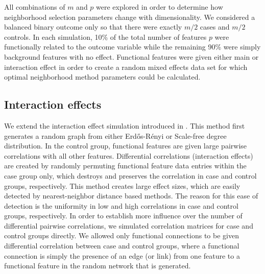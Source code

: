 \documentclass[10pt,letterpaper]{article}\usepackage[]{graphicx}\usepackage[]{color}
\begin{document}
All combinations of $m$ and $p$ were explored in order to determine how neighborhood selection parameters change with dimensionality. We considered a balanced binary outcome only so that there were exactly $m/2$ cases and $m/2$ controls. In each simulation, 10\% of the total number of features $p$ were functionally related to the outcome variable while the remaining 90\% were simply background features with no effect. Functional features were given either main or interaction effect in order to create a random mixed effects data set for which optimal neighborhood method parameters could be calculated. 

\subsection{Interaction effects}

We extend the interaction effect simulation introduced in \cite{lareau15}. This method first generates a random graph from either Erd\H{o}s-R\'{e}nyi or Scale-free degree distribution. In the control group, functional features are given large pairwise correlations with all other features. Differential correlations (interaction effects) are created by randomly permuting functional feature data entries within the case group only, which destroys and preserves the correlation in case and control groups, respectively. This method creates large effect sizes, which are easily detected by nearest-neighbor distance based methods. The reason for this ease of detection is the uniformity in low and high correlations in case and control groups, respectively. In order to establish more influence over the number of differential pairwise correlations, we simulated correlation matrices for case and control groups directly. We allowed only functional connections to be given differential correlation between case and control groups, where a functional connection is simply the presence of an edge (or link) from one feature to a functional feature in the random network that is generated.
\end{document}
